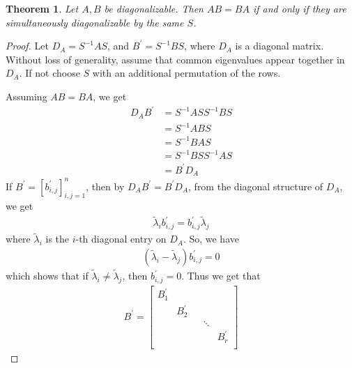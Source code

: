 \documentclass[11pt]{article}
\theoremstyle{plain} %
\newtheorem{theorem}{Theorem}[section]
\theoremstyle{definition} %
\theoremstyle{remark} %
\begin{document}
\begin{theorem}
  Let $A, B$ be diagonalizable. Then $AB = BA$ if and only if they
  are simultaneously diagonalizable by the same $S$.
\end{theorem}
\begin{proof}
  Let $D_A = S^{-1} A S$, and $B^\prime = S^{-1} B S$, where $D_A$ is
  a diagonal matrix. Without loss of generality, assume that common
  eigenvalues appear together in $D_A$. If not choose $S$ with an
  additional permutation of the rows.

  Assuming $AB = BA$, we get
  \begin{align*}
    D_AB^\prime &= S^{-1} ASS^{-1}BS \\
    &= S^{-1}ABS \\
    &= S^{-1}BAS \\
    &= S^{-1}BSS^{-1}AS \\
    &= B^\prime D_A
  \end{align*}
  If $B^\prime = [b_{i, j}^\prime]_{i, j = 1}^n$, then by $D_A
  B^\prime = B^\prime D_A$, from the diagonal structure of $D_A$, we get
  \begin{align*}
    \tilde{\lambda}_ib_{i, j}^\prime = b_{i, j}^\prime \tilde{\lambda}_j
  \end{align*}
  where $\tilde{\lambda}_i$ is the $i$-th diagonal entry on $D_A$.
  So, we have
  \begin{align*}
    (\tilde{ \lambda}_i - \tilde{\lambda}_j) b_{i, j}^\prime = 0
  \end{align*}
  which shows that if $\tilde{ \lambda}_i \neq \tilde{\lambda}_j$,
  then $b_{i, j}^\prime = 0$. Thus we get that
  \begin{align*}
    B^\prime =
    \begin{bmatrix}%
      B_1^\prime &  &  & \\
      & B_2^\prime &   & \\
      &  &  & \ddots  & \\
      &  & &   & B_r^\prime \\
    \end{bmatrix}
  \end{align*}


\end{proof}
\end{document}
